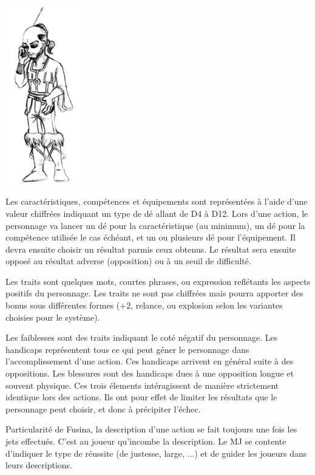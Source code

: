 \documentclass{DenebClass}
\begin{document}
\begin{multicols}{2}
\begin{center}
	\includegraphics[width=90pt]{../Img/centaurien}
\end{center}


Les caractéristiques, compétences et équipements sont représentées à l'aide d'une valeur chiffrées indiquant un type de dé allant de D4 à D12. Lors d'une action, le personnage va lancer un dé pour la caractéristique (au minimum), un dé pour la compétence utilisée le cas échéant, et un ou plusieurs dé pour l'équipement. Il devra ensuite choisir un résultat parmis ceux obtenus. Le résultat sera ensuite opposé au résultat adverse (opposition) ou à un seuil de difficulté.

Les traits sont quelques mots, courtes phrases, ou expression reflétants les aspects positifs du personnage. Les traits ne sont pas chiffrées mais pourra apporter des bonus sous différentes formes (+2, relance, ou explosion selon les variantes choisies pour le système).

Les faiblesses sont des traits indiquant le coté négatif du personnage. Les handicaps représentent tous ce qui peut géner le personnage dans l'accomplissement d'une action. Ces handicaps arrivent en général suite à des oppositions. Les blessures sont des handicaps dues à une opposition longue et souvent physique. Ces trois élements intéragissent de manière strictement identique lors des actions. Ils ont pour effet de limiter les résultats que le personnage peut choisir, et donc à précipiter l'échec.

Particularité de Fusina, la description d'une action se fait toujours une fois les jets effectués. C'est au joueur qu'incombe la description. Le MJ se contente d'indiquer le type de réussite (de justesse, large, ...) et de guider les joueurs dans leurs descriptions.


\end{multicols}
\end{document}
